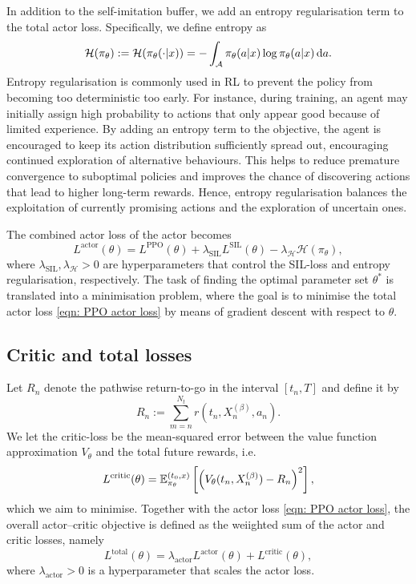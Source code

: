 In addition to the self-imitation buffer, we add an entropy regularisation term to the total actor loss. Specifically, we define entropy as 
\begin{equation}
    \mathcal{H}(\pi_\theta) := \mathcal{H}(\pi_\theta(\cdot | x)) = - \int_{\mathcal{A}} \pi_\theta (a|x) \log \pi_\theta (a | x) \,\mathrm{d} a. 
    \label{eqn: entropy regularisation}
\end{equation}
Entropy regularisation is commonly used in RL to prevent the policy from becoming too deterministic too early. For instance, during training, an agent may initially assign high probability to actions that only appear good because of limited experience. By adding an entropy term to the objective, the agent is encouraged to keep its action distribution  sufficiently spread out, encouraging continued exploration of alternative behaviours. This helps to reduce premature convergence to suboptimal policies and improves the chance of discovering actions that lead to higher long-term rewards. Hence, entropy regularisation balances the exploitation of currently promising actions and the exploration of uncertain ones. 

The combined actor loss of the actor becomes 
\begin{equation}
    L^{\text{actor}}(\theta) = L^{\text{PPO}}(\theta) + \lambda_{\text{SIL}} L^{\text{SIL}}(\theta) - \lambda_{\mathcal{H}} \mathcal{H}(\pi_\theta),
    \label{eqn: PPO actor loss}
\end{equation}
where $\lambda_{\text{SIL}}, \lambda_{\mathcal{H}} > 0$ are hyperparameters that control the SIL-loss and entropy regularisation, respectively. The task of finding the optimal parameter set $\theta^*$ is translated into a minimisation problem, where the goal is to minimise the total actor loss \eqref{eqn: PPO actor loss} by means of gradient descent with respect to $\theta$.

\subsection{Critic and total losses}
Let $R_n$ denote the pathwise return-to-go in the interval $[t_n,T]$ and define it by
\begin{equation}
    R_n := \sum_{m=n}^{N_t} r(t_n,X^{(\beta)}_n,a_n).
    \label{eqn: return-to-go}
\end{equation}
We let the critic-loss be the mean-squared error between the value function approximation $V_\theta$ and the total future rewards, i.e.
\begin{equation}
    L^{\text{critic}}(\theta) = \mathbb{E}^{(t_0,x)}_{\pi_\theta}\left[ \left(V_\theta(t_n,X^{(\beta)}_n) - R_n\right)^2 \right],
    \label{eqn: L-critic}
\end{equation}
which we aim to minimise. Together with the actor loss \eqref{eqn: PPO actor loss}, the overall actor–critic objective is defined as the weiighted sum of the actor and critic losses, namely
\begin{equation*}
    L^{\text{total}}(\theta) = \lambda_{\text{actor}} L^{\text{actor}}(\theta) + L^{\text{critic}}(\theta),
\end{equation*}
where $\lambda_{\text{actor}}>0$ is a hyperparameter that scales the actor loss. 

